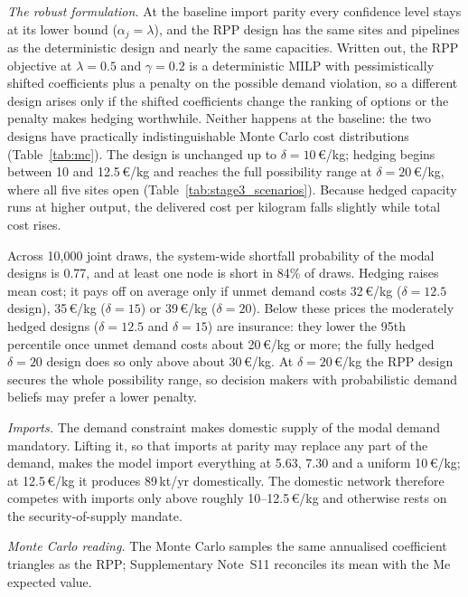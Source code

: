 \documentclass[preprint,12pt,authoryear]{elsarticle}
\begin{document}
\textit{The robust formulation.} At the baseline import parity every confidence level stays at its lower bound ($\alpha_j=\lambda$), and the RPP design has the same sites and pipelines as the deterministic design and nearly the same capacities. Written out, the RPP objective at $\lambda=0.5$ and $\gamma=0.2$ is a deterministic MILP with pessimistically shifted coefficients plus a penalty on the possible demand violation, so a different design arises only if the shifted coefficients change the ranking of options or the penalty makes hedging worthwhile. Neither happens at the baseline: the two designs have practically indistinguishable Monte Carlo cost distributions (Table~\ref{tab:mc}). The design is unchanged up to $\delta=10$\,€/kg; hedging begins between 10 and 12.5\,€/kg and reaches the full possibility range at $\delta=20$\,€/kg, where all five sites open (Table~\ref{tab:stage3_scenarios}). Because hedged capacity runs at higher output, the delivered cost per kilogram falls slightly while total cost rises.

Across 10,000 joint draws, the system-wide shortfall probability of the modal designs is 0.77, and at least one node is short in 84\% of draws. Hedging raises mean cost; it pays off on average only if unmet demand costs 32\,€/kg ($\delta = 12.5$ design), 35\,€/kg ($\delta=15$) or 39\,€/kg ($\delta=20$). Below these prices the moderately hedged designs ($\delta=12.5$ and $\delta=15$) are insurance: they lower the 95th percentile once unmet demand costs about 20\,€/kg or more; the fully hedged $\delta=20$ design does so only above about 30\,€/kg. At $\delta = 20$\,€/kg the RPP design secures the whole possibility range, so decision makers with probabilistic demand beliefs may prefer a lower penalty.

\textit{Imports.} The demand constraint makes domestic supply of the modal demand mandatory. Lifting it, so that imports at parity may replace any part of the demand, makes the model import everything at 5.63, 7.30 and a uniform 10\,€/kg; at 12.5\,€/kg it produces 89\,kt/yr domestically. The domestic network therefore competes with imports only above roughly 10--12.5\,€/kg and otherwise rests on the security-of-supply mandate.

\textit{Monte Carlo reading.} The Monte Carlo samples the same annualised coefficient triangles as the RPP; Supplementary Note~S11 reconciles its mean with the Me expected value.
\end{document}
